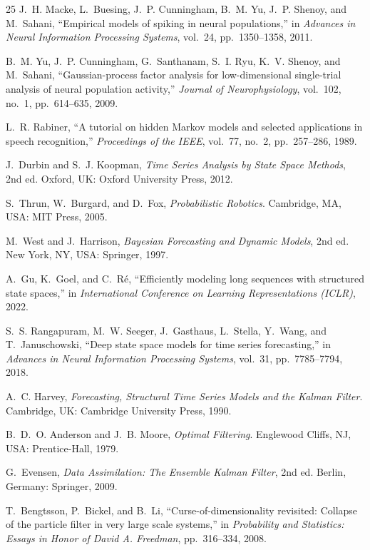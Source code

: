 \documentclass[conference]{IEEEtran}
\begin{document}
\begin{thebibliography}{25}
J.~H. Macke, L.~Buesing, J.~P. Cunningham, B.~M. Yu, J.~P. Shenoy, and M.~Sahani, ``Empirical models of spiking in neural populations,'' in \textit{Advances in Neural Information Processing Systems}, vol.~24, pp.~1350--1358, 2011.

B.~M. Yu, J.~P. Cunningham, G.~Santhanam, S.~I. Ryu, K.~V. Shenoy, and M.~Sahani, ``Gaussian-process factor analysis for low-dimensional single-trial analysis of neural population activity,'' \textit{Journal of Neurophysiology}, vol.~102, no.~1, pp.~614--635, 2009.

L.~R. Rabiner, ``A tutorial on hidden Markov models and selected applications in speech recognition,'' \textit{Proceedings of the IEEE}, vol.~77, no.~2, pp.~257--286, 1989.

J.~Durbin and S.~J. Koopman, \textit{Time Series Analysis by State Space Methods}, 2nd ed. Oxford, UK: Oxford University Press, 2012.

S.~Thrun, W.~Burgard, and D.~Fox, \textit{Probabilistic Robotics}. Cambridge, MA, USA: MIT Press, 2005.

M.~West and J.~Harrison, \textit{Bayesian Forecasting and Dynamic Models}, 2nd ed. New York, NY, USA: Springer, 1997.

A.~Gu, K.~Goel, and C.~R{\'e}, ``Efficiently modeling long sequences with structured state spaces,'' in \textit{International Conference on Learning Representations (ICLR)}, 2022.

S.~S. Rangapuram, M.~W. Seeger, J.~Gasthaus, L.~Stella, Y.~Wang, and T.~Januschowski, ``Deep state space models for time series forecasting,'' in \textit{Advances in Neural Information Processing Systems}, vol.~31, pp.~7785--7794, 2018.

A.~C. Harvey, \textit{Forecasting, Structural Time Series Models and the Kalman Filter}. Cambridge, UK: Cambridge University Press, 1990.

B.~D.~O. Anderson and J.~B. Moore, \textit{Optimal Filtering}. Englewood Cliffs, NJ, USA: Prentice-Hall, 1979.

G.~Evensen, \textit{Data Assimilation: The Ensemble Kalman Filter}, 2nd ed. Berlin, Germany: Springer, 2009.

T.~Bengtsson, P.~Bickel, and B.~Li, ``Curse-of-dimensionality revisited: Collapse of the particle filter in very large scale systems,'' in \textit{Probability and Statistics: Essays in Honor of David A. Freedman}, pp.~316--334, 2008.


\end{thebibliography}
\end{document}
